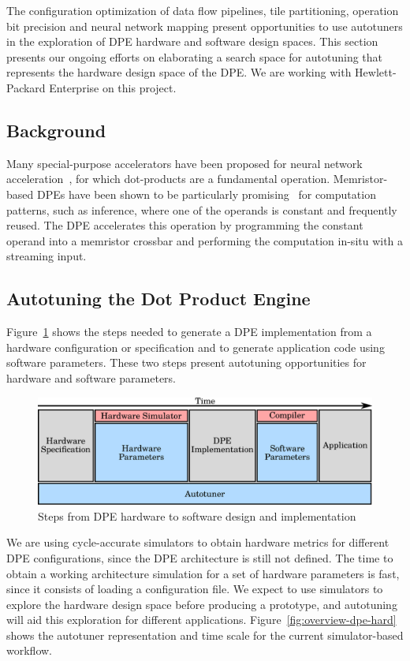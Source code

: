 The configuration optimization of data flow pipelines, tile partitioning,
operation bit precision and neural network mapping present opportunities to use
autotuners in the exploration of DPE hardware and software design spaces.  This
section presents our ongoing efforts on elaborating a search space for
autotuning that represents the hardware design space of the DPE.  We are
working with Hewlett-Packard Enterprise on this project.

\subsection{Background}

Many special-purpose accelerators have been proposed for neural network
acceleration~\cite{chen2014dadiannao,chi2016prime,shafiee2016isaac}, for which
dot-products are a fundamental operation.  Memristor-based DPEs have been shown
to be particularly promising~\cite{shafiee2016isaac} for computation patterns,
such as inference, where one of the operands is constant and frequently reused.
The DPE accelerates this operation by programming the constant operand into a
memristor crossbar and performing the computation in-situ with a streaming
input.

\subsection{Autotuning the Dot Product Engine}

Figure~\ref{fig:dpe-stack} shows the steps needed to generate a DPE
implementation from a hardware configuration or specification and to generate
application code using software parameters. These two steps present
autotuning opportunities for hardware and software parameters.

\begin{figure}[htpb]
    \centering
    \includegraphics[width=.65\textwidth]{./images/dpe-stack}
    \caption{Steps from DPE hardware to software design and implementation}
    \label{fig:dpe-stack}
\end{figure}

We are using cycle-accurate simulators to obtain hardware metrics for different
DPE configurations, since the DPE architecture is still not defined.  The time
to obtain a working architecture simulation for a set of hardware parameters is
fast, since it consists of loading a configuration file.  We expect to use
simulators to explore the hardware design space before producing a prototype,
and autotuning will aid this exploration for different applications.
Figure~\ref{fig:overview-dpe-hard} shows the autotuner representation and time
scale for the current simulator-based workflow.

